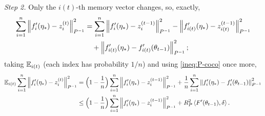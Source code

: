 \emph{Step 2.} Only the $i(t)$-th memory vector changes, so, exactly,
\begin{align*}
\sum_{i=1}^n\left\|f'_i(\eta_\ast)-z_i^{(t)}\right\|_{P^{-1}}^2&=\sum_{i=1}^n\left\|f'_i(\eta_\ast)-z_i^{(t-1)}\right\|_{P^{-1}}^2
-\left\|f'_{i(t)}(\eta_\ast)-z_{i(t)}^{(t-1)}\right\|_{P^{-1}}^2\\
&\quad+\left\|f'_{i(t)}(\eta_\ast)-f'_{i(t)}(\theta_{t-1})\right\|_{P^{-1}}^2 ;
\end{align*}
taking $\mathbb{E}_{i(t)}$ (each index has probability $1/n$) and using \eqref{ineq:P-coco} once more,
\begin{align}
\mathbb{E}_{i(t)}\sum_{i=1}^n\left\|f'_i(\eta_\ast)-z_i^{(t)}\right\|_{P^{-1}}^2
&=\Big(1-\frac1n\Big)\sum_{i=1}^n\left\|f'_i(\eta_\ast)-z_i^{(t-1)}\right\|_{P^{-1}}^2
+\frac1n\sum_{i=1}^n\left\|f'_i(\eta_\ast)-f'_i(\theta_{t-1})\right\|_{P^{-1}}^2\nonumber\\
&\le\Big(1-\frac1n\Big)\sum_{i=1}^n\left\|f'_i(\eta_\ast)-z_i^{(t-1)}\right\|_{P^{-1}}^2
+R_P^2\left\langle F'(\theta_{t-1}), \delta \right\rangle.\label{eq:B1-step2}
\end{align}

